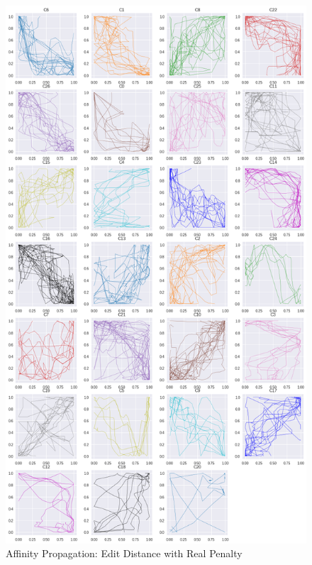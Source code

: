 \begin{figure}[h]
  \centering
  \includegraphics[width=\linewidth,height=\textheight,keepaspectratio]{figs/clusters/CLU_AP_ALL[ERP;g=0,0].png}
  \caption{Affinity Propagation: Edit Distance with Real Penalty}
\end{figure}

